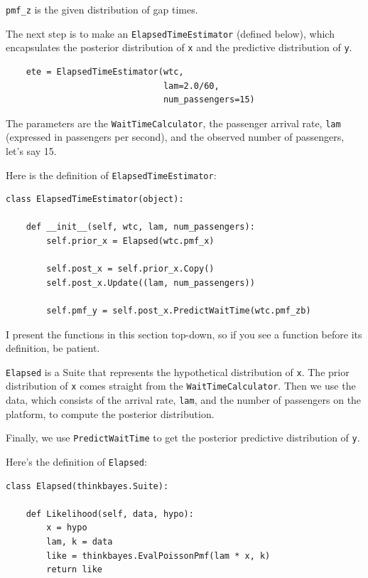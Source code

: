 \documentclass[12pt]{book}
\begin{document}
\verb"pmf_z" is the given distribution of gap times.

The next step is to make an {\tt ElapsedTimeEstimator} (defined
below), which encapsulates the posterior distribution of {\tt x} and
the predictive distribution of {\tt y}.

\begin{verbatim}
    ete = ElapsedTimeEstimator(wtc,
                               lam=2.0/60,
                               num_passengers=15)
\end{verbatim}

The parameters are the {\tt WaitTimeCalculator}, the passenger
arrival rate, {\tt lam} (expressed in passengers per second),
and the observed number of passengers, let's say 15.

Here is the definition of {\tt ElapsedTimeEstimator}:

\begin{verbatim}
class ElapsedTimeEstimator(object):

    def __init__(self, wtc, lam, num_passengers):
        self.prior_x = Elapsed(wtc.pmf_x)

        self.post_x = self.prior_x.Copy()
        self.post_x.Update((lam, num_passengers))

        self.pmf_y = self.post_x.PredictWaitTime(wtc.pmf_zb)
\end{verbatim}

I present the functions in this section top-down, so if you see a
function before its definition, be patient.

{\tt Elapsed} is a Suite that represents the hypothetical
distribution of {\tt x}.  The prior distribution of {\tt x}
comes straight from the {\tt WaitTimeCalculator}.  Then we
use the data, which consists of the arrival rate, {\tt lam},
and the number of passengers on the platform, to compute
the posterior distribution.

Finally, we use {\tt PredictWaitTime} to get the posterior
predictive distribution of {\tt y}.

Here's the definition of {\tt Elapsed}:

\begin{verbatim}
class Elapsed(thinkbayes.Suite):

    def Likelihood(self, data, hypo):
        x = hypo
        lam, k = data
        like = thinkbayes.EvalPoissonPmf(lam * x, k)
        return like
\end{verbatim}
\end{document}
